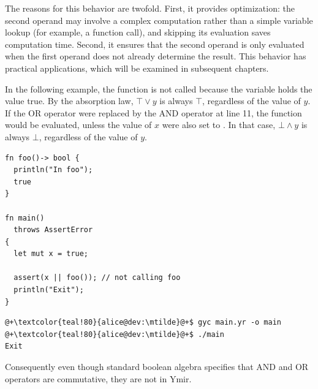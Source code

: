The reasons for this behavior are twofold. First, it provides optimization: the
second operand may involve a complex computation rather than a simple variable
lookup (for example, a function call), and skipping its evaluation saves
computation time. Second, it ensures that the second operand is only evaluated
when the first operand does not already determine the result. This behavior has
practical applications, which will be examined in subsequent chapters.

In the following example, the function  is not called because the
variable  holds the value true. By the absorption law, $\top \lor y$ is
always $\top$, regardless of the value of $y$. If the OR operator were replaced
by the AND operator \token{&&} at line 11, the function  would be
evaluated, unless the value of $x$ were also set to . In that case,
$\bot \land y$ is always $\bot$, regardless of the value of $y$.

\begin{lstlisting}[style=coloredverbatim, caption=Example of boolean operation optimised out]
fn foo()-> bool {
  println("In foo");
  true
}

fn main()
  throws AssertError
{
  let mut x = true;

  assert(x || foo()); // not calling foo
  println("Exit");
}
\end{lstlisting}
\begin{lstlisting}[style=bashVerb, escapechar=@+]
@+\textcolor{teal!80}{alice@dev:\mtilde}@+$ gyc main.yr -o main
@+\textcolor{teal!80}{alice@dev:\mtilde}@+$ ./main
Exit
\end{lstlisting}


Consequently even though standard boolean algebra specifies that AND and OR
operators are commutative, they are not in Ymir.
